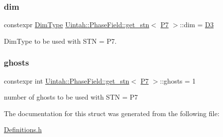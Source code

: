 \subsubsection{\texorpdfstring{dim}{dim}}
{\footnotesize\ttfamily constexpr \hyperlink{namespaceUintah_1_1PhaseField_a12bfc68444894dffdf0cb8d9cf0cc76a}{Dim\+Type} \hyperlink{structUintah_1_1PhaseField_1_1get__stn}{Uintah\+::\+Phase\+Field\+::get\+\_\+stn}$<$ \hyperlink{namespaceUintah_1_1PhaseField_a24d833a720598df1020f5cc2e75f8702a099a5b9a00f5644bb917fdec6afd8768}{P7} $>$\+::dim = \hyperlink{namespaceUintah_1_1PhaseField_a12bfc68444894dffdf0cb8d9cf0cc76aa72fd61934c7ca788c49ad90629f76e78}{D3}\hspace{0.3cm}{\ttfamily [static]}}



Dim\+Type to be used with S\+TN = P7. 

\mbox{\label{structUintah_1_1PhaseField_1_1get__stn_3_01P7_01_4_af08edc97f6f80ca3946b9ebba54a943e}} 
\subsubsection{\texorpdfstring{ghosts}{ghosts}}
{\footnotesize\ttfamily constexpr int \hyperlink{structUintah_1_1PhaseField_1_1get__stn}{Uintah\+::\+Phase\+Field\+::get\+\_\+stn}$<$ \hyperlink{namespaceUintah_1_1PhaseField_a24d833a720598df1020f5cc2e75f8702a099a5b9a00f5644bb917fdec6afd8768}{P7} $>$\+::ghosts = 1\hspace{0.3cm}{\ttfamily [static]}}



number of ghosts to be used with S\+TN = P7 



The documentation for this struct was generated from the following file\+:\begin{DoxyCompactItemize}
\item 
\hyperlink{Definitions_8h}{Definitions.\+h}\end{DoxyCompactItemize}
